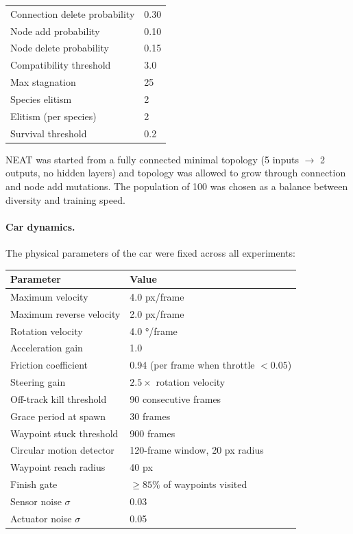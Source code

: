 \documentclass[a4paper]{article}
\begin{document}
\begin{center}
\begin{tabular}{ll}
Connection delete probability     & 0.30           \\
Node add probability              & 0.10           \\
Node delete probability           & 0.15           \\
\midrule
Compatibility threshold           & 3.0            \\
Max stagnation                    & 25             \\
Species elitism                   & 2              \\
Elitism (per species)             & 2              \\
Survival threshold                & 0.2            \\
\bottomrule
\end{tabular}
\end{center}

NEAT was started from a fully connected minimal topology (5 inputs $\rightarrow$
2 outputs, no hidden layers) and topology was allowed to grow through connection and
node add mutations.
The population of 100 was chosen as a balance between diversity and training speed.

\paragraph{Car dynamics.}
The physical parameters of the car were fixed across all experiments:

\begin{center}
\begin{tabular}{ll}
\toprule
\textbf{Parameter} & \textbf{Value} \\ \midrule
Maximum velocity          & 4.0 px/frame  \\
Maximum reverse velocity  & 2.0 px/frame  \\
Rotation velocity         & 4.0 °/frame   \\
Acceleration gain         & 1.0           \\
Friction coefficient      & 0.94 (per frame when throttle $< 0.05$) \\
Steering gain             & $2.5 \times$ rotation velocity \\
\midrule
Off-track kill threshold  & 90 consecutive frames \\
Grace period at spawn     & 30 frames      \\
Waypoint stuck threshold  & 900 frames     \\
Circular motion detector  & 120-frame window, 20 px radius \\
Waypoint reach radius     & 40 px          \\
Finish gate               & $\geq 85\%$ of waypoints visited \\
\midrule
Sensor noise $\sigma$     & 0.03           \\
Actuator noise $\sigma$   & 0.05           \\
\bottomrule
\end{tabular}
\end{center}
\end{document}
